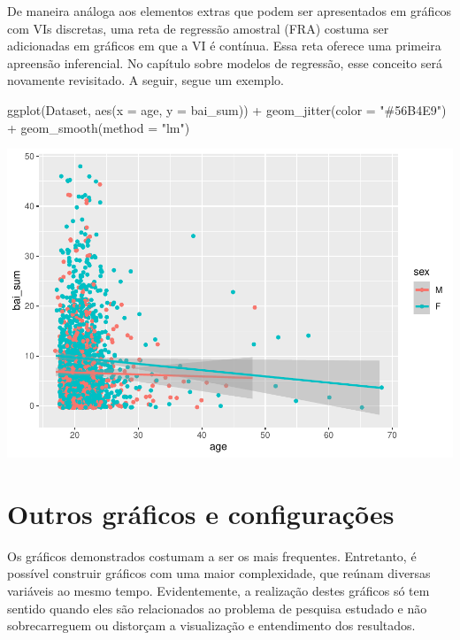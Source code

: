 \documentclass[
]{book}
\newenvironment{Shaded}{\begin{snugshade}}{\end{snugshade}}
\newcommand{\AttributeTok}[1]{\textcolor[rgb]{0.77,0.63,0.00}{#1}}
\newcommand{\FunctionTok}[1]{\textcolor[rgb]{0.00,0.00,0.00}{#1}}
\newcommand{\NormalTok}[1]{#1}
\newcommand{\SpecialCharTok}[1]{\textcolor[rgb]{0.00,0.00,0.00}{#1}}
\newcommand{\StringTok}[1]{\textcolor[rgb]{0.31,0.60,0.02}{#1}}
\begin{document}
De maneira análoga aos elementos extras que podem ser apresentados em gráficos com VIs discretas, uma reta de regressão amostral (FRA) costuma ser adicionadas em gráficos em que a VI é contínua. Essa reta oferece uma primeira apreensão inferencial. No capítulo sobre modelos de regressão, esse conceito será novamente revisitado. A seguir, segue um exemplo.

\begin{Shaded}
\begin{Highlighting}[]
\FunctionTok{ggplot}\NormalTok{(Dataset, }\FunctionTok{aes}\NormalTok{(}\AttributeTok{x =}\NormalTok{ age, }\AttributeTok{y =}\NormalTok{ bai\_sum)) }\SpecialCharTok{+}
  \FunctionTok{geom\_jitter}\NormalTok{(}\AttributeTok{color =} \StringTok{"\#56B4E9"}\NormalTok{) }\SpecialCharTok{+}
  \FunctionTok{geom\_smooth}\NormalTok{(}\AttributeTok{method =} \StringTok{"lm"}\NormalTok{)}
\end{Highlighting}
\end{Shaded}

\begin{center}\includegraphics{gitbook-demo_files/figure-latex/unnamed-chunk-26-1} \end{center}

\hypertarget{outros-gruxe1ficos-e-configurauxe7uxf5es}{%
\section{Outros gráficos e configurações}\label{outros-gruxe1ficos-e-configurauxe7uxf5es}}

Os gráficos demonstrados costumam a ser os mais frequentes. Entretanto, é possível construir gráficos com uma maior complexidade, que reúnam diversas variáveis ao mesmo tempo. Evidentemente, a realização destes gráficos só tem sentido quando eles são relacionados ao problema de pesquisa estudado e não sobrecarreguem ou distorçam a visualização e entendimento dos resultados.
\end{document}
